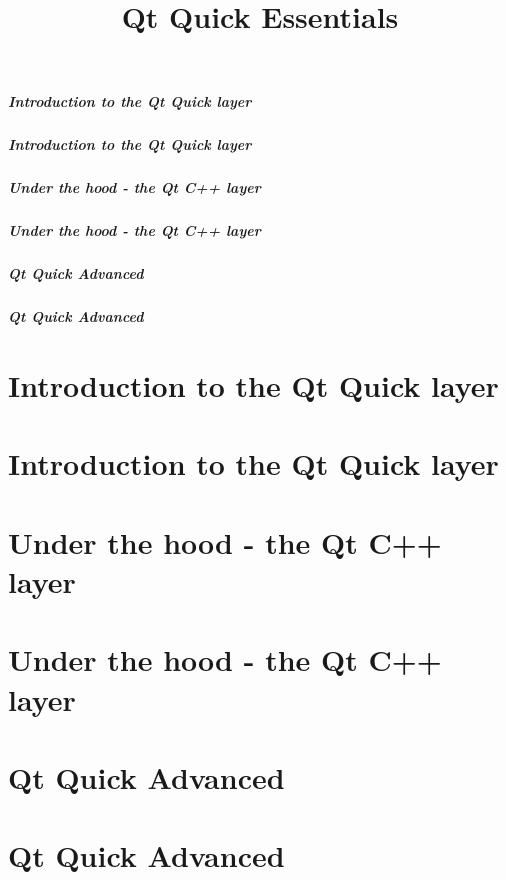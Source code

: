 \documentclass[t]{beamer}
\title{Qt Quick Essentials}
\begin{document}


\setcounter{tocdepth}{2} %
\begin{frame}
  \frametitle{Introduction to the Qt Quick layer}
  \tableofcontents[part=1]
\end{frame}

\begin{frame}
  \frametitle{Introduction to the Qt Quick layer}
  \tableofcontents[part=2]
\end{frame}

\begin{frame}
  \frametitle{Under the hood - the Qt C++ layer}
  \tableofcontents[part=3]
\end{frame}

\begin{frame}
  \frametitle{Under the hood - the Qt C++ layer}
  \tableofcontents[part=4]
\end{frame}

\begin{frame}
  \frametitle{Qt Quick Advanced}
  \tableofcontents[part=5]
\end{frame}

\begin{frame}
  \frametitle{Qt Quick Advanced}
  \tableofcontents[part=6]
\end{frame}

\setcounter{tocdepth}{3} %

\part{Introduction to the Qt Quick layer}




\part{Introduction to the Qt Quick layer}





\part{Under the hood - the Qt C++ layer}



\part{Under the hood - the Qt C++ layer}


\part{Qt Quick Advanced}



\part{Qt Quick Advanced}




\end{document}

